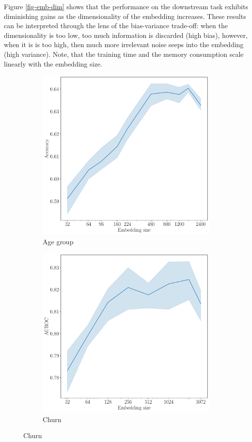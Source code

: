 \documentclass[sigconf]{acmart}
\newcommand{\revised}[1]{#1}
\begin{document}
\revised{
Figure \ref{fig-emb-dim} shows that the performance on the downstream task exhibits diminishing
gains as the dimensionality of the embedding increases. These results can be interpreted through
the lens of the bias-variance trade-off: when the dimensionality is too low, too much information
is discarded (high bias), however, when it is is too high, then much more irrelevant noise seeps
into the embedding (high variance).
%
Note, that the training time and the memory consumption scale linearly with the embedding size.
}

\begin{figure}
  \centering
  \begin{subfigure}{0.25\linewidth}
    \caption{Age group}
    \includegraphics[width=\linewidth]{figures/hidden_size_age_pred.pdf}
  \end{subfigure}%
  \begin{subfigure}{0.25\linewidth}
    \caption{Churn}
    \includegraphics[width=\linewidth]{figures/hidden_size_rosbank.pdf}

\end{subfigure}
\end{figure}
\end{document}

